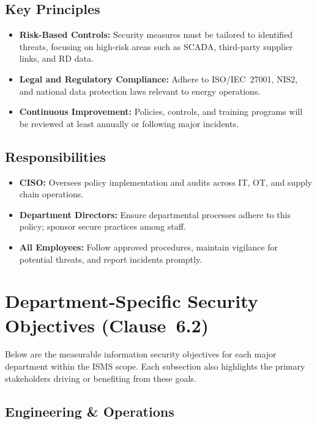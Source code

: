 \subsection*{Key Principles}
\begin{itemize}
      \item \textbf{Risk-Based Controls:} Security measures must be
            tailored to identified threats, focusing on high-risk areas
            such as \ac{SCADA}, third-party supplier links, and \ac{RD} data.
      \item \textbf{Legal and Regulatory Compliance:} Adhere to
            ISO/IEC~27001, \ac{NIS2}, and national data protection laws
            relevant to energy operations.
      \item \textbf{Continuous Improvement:} Policies, controls, and
            training programs will be reviewed at least annually or
            following major incidents.
\end{itemize}

\subsection*{Responsibilities}
\begin{itemize}
      \item \textbf{\ac{CISO}:} Oversees policy implementation and audits
            across \ac{IT}, \ac{OT}, and supply chain operations.
      \item \textbf{Department Directors:} Ensure departmental processes
            adhere to this policy; sponsor secure practices among staff.
      \item \textbf{All Employees:} Follow approved procedures, maintain
            vigilance for potential threats, and report incidents promptly.
\end{itemize}

\section{Department-Specific Security Objectives (Clause~6.2)}
\label{sec:department_objectives}

Below are the measurable information security objectives for each major
department within the \ac{ISMS} scope. Each subsection also highlights
the primary stakeholders driving or benefiting from these goals.

\subsection{Engineering \& Operations}
